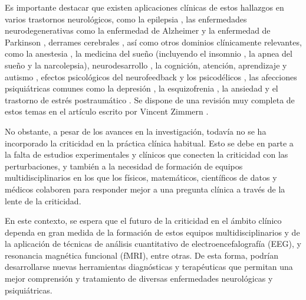 Es importante destacar que existen aplicaciones clínicas de estos hallazgos en varios trastornos neurológicos, como la epilepsia \cite{osorio_epileptic_2010,witton_rogue_2019,kramer_human_2012,moosavi_criticality_2023,meisel_antiepileptic_2020}, las enfermedades neurodegenerativas como la enfermedad de Alzheimer \cite{stam_disturbed_2005,montez_altered_2009,vysata_change_2014} y la enfermedad de Parkinson \cite{hohlefeld_long-range_2012,herrojo_ruiz_long-range_2014,west_parkinsonian_2016}, derrames cerebrales \cite{rocha_recovery_2022}, así como otros dominios clínicamente relevantes, como la anestesia \cite{alonso_dynamical_2014,thiery_long-range_2018,liu_scale-free_2014}, la medicina del sueño \cite{bocaccio_avalanche-like_2019} (incluyendo el insomnio \cite{meisel_decline_2017,colombo_more_2016}, la apnea del sueño \cite{lo_asymmetry_2013} y la narcolepsia), neurodesarrollo \cite{padilla_breakdown_2020,smit_scale-free_2011,mares_age-dependent_2013}, la cognición, atención, aprendizaje y autismo \cite{ezaki_closer_2020,jia_attenuation_2018,ouyang_decomposing_2020,tinker_power_2014,dimitriadis_altered_2013}, efectos psicológicos del neurofeedback y los psicodélicos \cite{zhigalov_modulation_2016,tagliazucchi_enhanced_2014}, las afecciones psiquiátricas comunes como la depresión \cite{gartner_aberrant_2017}, la esquizofrenia \cite{moran_long-range_2019}, la ansiedad \cite{tolkunov_power_2010} y el trastorno de estrés postraumático \cite{ros_tuning_2014}.  Se dispone de una revisión muy completa de estos temas en el artículo escrito por Vincent Zimmern \cite{zimmern_why_2020}.

No obstante, a pesar de los avances en la investigación, todavía no se ha incorporado la criticidad en la práctica clínica habitual. Esto se debe en parte a la falta de estudios experimentales y clínicos que conecten la criticidad con las perturbaciones, y también a la necesidad de formación de equipos multidisciplinarios en los que los físicos, matemáticos, científicos de datos y médicos colaboren para responder mejor a una pregunta clínica a través de la lente de la criticidad.

En este contexto, se espera que el futuro de la criticidad en el ámbito clínico dependa en gran medida de la formación de estos equipos multidisciplinarios y de la aplicación de técnicas de análisis cuantitativo de electroencefalografía (\gls{EEG}),  y resonancia magnética funcional (\gls{fMRI}), entre otras. De esta forma, podrían desarrollarse nuevas herramientas diagnósticas y terapéuticas que permitan una mejor comprensión y tratamiento de diversas enfermedades neurológicas y psiquiátricas.



